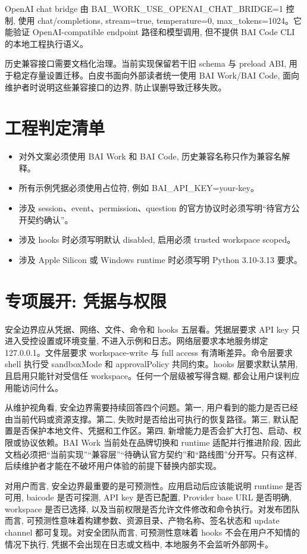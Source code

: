 OpenAI chat bridge 由 BAI\_WORK\_USE\_OPENAI\_CHAT\_BRIDGE=1 控制, 使用 chat/completions, stream=true, temperature=0, max\_tokens=1024。它能验证 OpenAI-compatible endpoint 路径和模型调用, 但不提供 BAI Code CLI 的本地工程执行语义。

历史兼容接口需要文档化治理。当前实现保留若干旧 schema 与 preload ABI, 用于稳定存量设置迁移。白皮书面向外部读者统一使用 BAI Work/BAI Code, 面向维护者时说明这些兼容接口的边界, 防止误删导致迁移失败。

\section{工程判定清单}
\begin{itemize}
  \item 对外文案必须使用 BAI Work 和 BAI Code, 历史兼容名称只作为兼容名解释。
  \item 所有示例凭据必须使用占位符, 例如 BAI\_API\_KEY=your-key。
  \item 涉及 session、event、permission、question 的官方协议时必须写明“待官方公开契约确认”。
  \item 涉及 hooks 时必须写明默认 disabled, 启用必须 trusted workspace scoped。
  \item 涉及 Apple Silicon 或 Windows runtime 时必须写明 Python 3.10-3.13 要求。
\end{itemize}

\section{专项展开: 凭据与权限}
安全边界应从凭据、网络、文件、命令和 hooks 五层看。凭据层要求 API key 只进入受控设置或环境变量, 不进入示例和日志。网络层要求本地服务绑定 127.0.0.1。文件层要求 workspace-write 与 full access 有清晰差异。命令层要求 shell 执行受 sandboxMode 和 approvalPolicy 共同约束。hooks 层要求默认禁用, 且启用只能针对受信任 workspace。任何一个层级被写得含糊, 都会让用户误判应用能访问什么。

从维护视角看, 安全边界需要持续回答四个问题。第一, 用户看到的能力是否已经由当前代码或资源支撑。第二, 失败时是否给出可执行的恢复路径。第三, 默认配置是否保护本地文件、凭据和工作区。第四, 新增能力是否会扩大打包、启动、权限或协议依赖。BAI Work 当前处在品牌切换和 runtime 适配并行推进阶段, 因此文档必须把“当前实现”“兼容层”“待确认官方契约”和“路线图”分开写。只有这样, 后续维护者才能在不破坏用户体验的前提下替换内部实现。

对用户而言, 安全边界最重要的是可预测性。应用启动后应该能说明 runtime 是否可用, baicode 是否可探测, API key 是否已配置, Provider base URL 是否明确, workspace 是否已选择, 以及当前权限是否允许文件修改和命令执行。对发布团队而言, 可预测性意味着构建参数、资源目录、产物名称、签名状态和 update channel 都可复现。对安全团队而言, 可预测性意味着 hooks 不会在用户不知情的情况下执行, 凭据不会出现在日志或文档中, 本地服务不会监听外部网卡。

